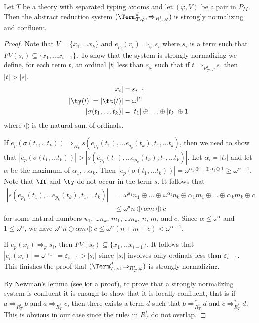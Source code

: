 \begin{lem}
Let $T$ be a theory with separated typing axioms and let $(\varphi,V)$ be a pair in $P_M$.
Then the abstract reduction system $(\Term_{T,\varphi}^d,\Rightarrow_{R^t_T,\varphi})$ is strongly normalizing and confluent.
\end{lem}
\begin{proof}
Note that $V = \{ x_1, \ldots x_k \}$ and $e_{p_i}(x_i) \Rightarrow_\varphi s_i$ where $s_i$ is a term such that $FV(s_i) \subseteq \{ x_1, \ldots x_{i-1} \}$.
To show that the system is strongly normalizing we define, for each term $t$, an ordinal $|t|$ less than $\varepsilon_\omega$ such that if $t \Rightarrow_{R^t_T,\varphi} s$, then $|t| > |s|$.
\begin{align*}
|x_i| & = \varepsilon_{i-1} \\
|\ty(t)| = |\ft(t)| & = \omega^{|t|}\\
|\sigma(t_1, \ldots t_k)| & = |t_1| \oplus \ldots \oplus |t_k| \oplus 1
\end{align*}
where $\oplus$ is the natural sum of ordinals.

If $e_p(\sigma(t_1, \ldots t_k)) \Rightarrow_{R_T^t} s(e_{p_1}(t_1), \ldots e_{p_k}(t_k), t_1, \ldots t_k)$, then we need to show that $|e_p(\sigma(t_1, \ldots t_k))| > |s(e_{p_1}(t_1), \ldots e_{p_k}(t_k), t_1, \ldots t_k)|$.
Let $\alpha_i = |t_i|$ and let $\alpha$ be the maximum of $\alpha_1$, \ldots $\alpha_k$.
Then $|e_p(\sigma(t_1, \ldots t_k))| = \omega^{\alpha_1 \oplus \ldots \oplus \alpha_k \oplus 1} \geq \omega^{\alpha + 1}$.
Note that $\ft$ and $\ty$ do not occur in the term $s$.
It follows that
\begin{align*}
|s(e_{p_1}(t_1), \ldots e_{p_k}(t_k), t_1, \ldots t_k)| & = \omega^{\alpha_1} n_1 \oplus \ldots \oplus \omega^{\alpha_k} n_k \oplus \alpha_1 m_1 \oplus \ldots \oplus \alpha_k m_k \oplus c \\
                                                        & \leq \omega^\alpha n \oplus \alpha m \oplus c
\end{align*}
for some natural numbers $n_1$, \ldots $n_k$, $m_1$, \ldots $m_k$, $n$, $m$, and $c$.
Since $\alpha \leq \omega^\alpha$ and $1 \leq \omega^\alpha$, we have $\omega^\alpha n \oplus \alpha m \oplus c \leq \omega^\alpha (n + m + c) < \omega^{\alpha + 1}$.

If $e_p(x_i) \Rightarrow_\varphi s_i$, then $FV(s_i) \subseteq \{ x_1, \ldots x_{i-1} \}$.
It follows that $|e_p(x_i)| = \omega^{\varepsilon_{i-1}} = \varepsilon_{i-1} > |s_i|$ since $|s_i|$ involves only ordinals less than $\varepsilon_{i-1}$.
This finishes the proof that $(\Term_{T,\varphi}^d,\Rightarrow_{R^t_T,\varphi})$ is strongly normalizing.

By Newman's lemma (see \cite[Lemma~2.2.5]{ohlebusch-advanced} for a proof), to prove that a strongly normalizing system is confluent it is enough to show that it is locally confluent,
that is if $a \Rightarrow_{R^t_T} b$ and $a \Rightarrow_{R^t_T} c$, then there exists a term $d$ such that $b \Rightarrow_{R^t_T}^* d$ and $c \Rightarrow_{R^t_T}^* d$.
This is obvious in our case since the rules in $R^t_T$ do not overlap.
\end{proof}

